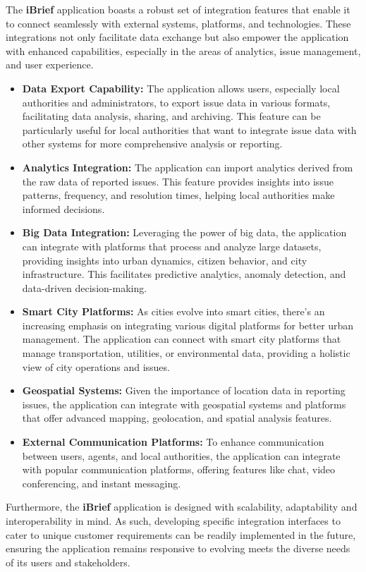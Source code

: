 The \textbf{iBrief} application boasts a robust set of integration features that enable it to connect seamlessly with external systems, platforms, and technologies. These integrations not only facilitate data exchange but also empower the application with enhanced capabilities, especially in the areas of analytics, issue management, and user experience.

\begin{itemize}
    \item \textbf{Data Export Capability:}
    The application allows users, especially local authorities and administrators, to export issue data in various formats, facilitating data analysis, sharing, and archiving. This feature can be particularly useful for local authorities that want to integrate issue data with other systems for more comprehensive analysis or reporting.
    
    \item \textbf{Analytics Integration:}
    The application can import analytics derived from the raw data of reported issues. This feature provides insights into issue patterns, frequency, and resolution times, helping local authorities make informed decisions.
    
    \item \textbf{Big Data Integration:}
    Leveraging the power of big data, the application can integrate with platforms that process and analyze large datasets, providing insights into urban dynamics, citizen behavior, and city infrastructure. This facilitates predictive analytics, anomaly detection, and data-driven decision-making.
    
    \item \textbf{Smart City Platforms:}
    As cities evolve into smart cities, there's an increasing emphasis on integrating various digital platforms for better urban management. The application can connect with smart city platforms that manage transportation, utilities, or environmental data, providing a holistic view of city operations and issues.
    
    \item \textbf{Geospatial Systems:}
    Given the importance of location data in reporting issues, the application can integrate with geospatial systems and platforms that offer advanced mapping, geolocation, and spatial analysis features.
    
    \item \textbf{External Communication Platforms:}
    To enhance communication between users, agents, and local authorities, the application can integrate with popular communication platforms, offering features like chat, video conferencing, and instant messaging.
\end{itemize}

Furthermore, the \textbf{iBrief} application is designed with scalability, adaptability and interoperability in mind. As such, developing specific integration interfaces to cater to unique customer requirements can be readily implemented in the future, ensuring the application remains responsive to evolving meets the diverse needs of its users and stakeholders.

